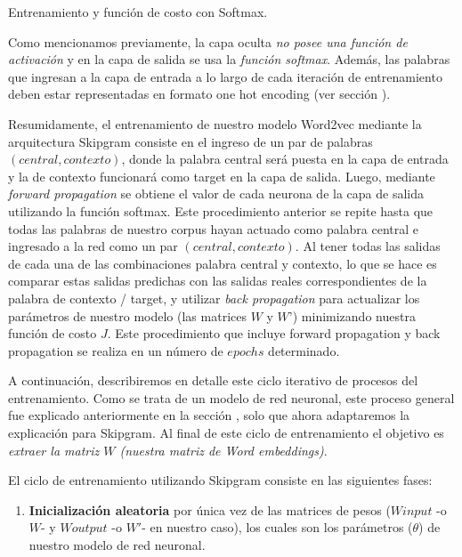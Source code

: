 \documentclass[12pt,a4paper]{article}
\makeatletter
\renewcommand\paragraph{\@startsection{paragraph}{4}{\z@}
            {-2.5ex\@plus -1ex \@minus -.25ex}
            {1.25ex \@plus .25ex}
            {\normalfont\normalsize\bfseries}}
\makeatother
\begin{document}
\begin{sloppypar}
\cleardoublepage

\paragraph{Entrenamiento y función de costo con Softmax.}\label{ent_costo_softmax}

Como mencionamos previamente, la capa oculta \textit{no posee una función de activación} y en la capa de salida se usa la \textit{función softmax}. Además, las palabras que ingresan a la capa de entrada a lo largo de cada iteración de entrenamiento deben estar representadas en formato one hot encoding (ver sección \textit{}).

Resumidamente, el entrenamiento de nuestro modelo Word2vec mediante la arquitectura Skipgram consiste en el ingreso de un par de palabras $(central, contexto)$, donde la palabra central será puesta en la capa de entrada y la de contexto funcionará como target en la capa de salida. Luego, mediante \textit{forward propagation} se obtiene el valor de cada neurona de la capa de salida utilizando la función softmax. Este procedimiento anterior se repite hasta que todas las palabras de nuestro corpus hayan actuado como palabra central e ingresado a la red como un par $(central, contexto)$.
Al tener todas las salidas de cada una de las combinaciones palabra central y contexto, lo que se hace es comparar estas salidas predichas con las salidas reales correspondientes de la palabra de contexto / target, y utilizar \textit{back propagation} para actualizar los parámetros de nuestro modelo (las matrices $W$ y $W’$) minimizando nuestra función de costo $J$. Este procedimiento que incluye forward propagation y back propagation se realiza en un número de $epochs$ determinado. 

A continuación, describiremos en detalle este ciclo iterativo de procesos del entrenamiento. Como se trata de un modelo de red neuronal, este proceso general fue explicado anteriormente en la sección \textit{}, solo que ahora adaptaremos la explicación para Skipgram. Al final de este ciclo de entrenamiento el objetivo es \textit{extraer la matriz $W$ (nuestra matriz de Word embeddings)}.

El ciclo de entrenamiento utilizando Skipgram consiste en las siguientes fases:
\begin{enumerate}

\item \textbf{Inicialización aleatoria} por única vez de las matrices de pesos ($W input$ -o $W$- y $W output$ -o $W'$- en nuestro caso), los cuales son los parámetros ($\theta$) de nuestro modelo de red neuronal.  


\end{enumerate}
\end{sloppypar}
\end{document}
